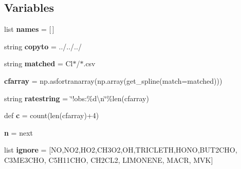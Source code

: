 \subsection*{Variables}
\begin{DoxyCompactItemize}
\item 
\mbox{\label{namespacefitobs_aabd7a9a2b56b48331a5d9031515b1592}} 
list {\bfseries names} = \mbox{[}$\,$\mbox{]}
\item 
\mbox{\label{namespacefitobs_afbd7256f05cd54c9c9db58e9d3765fab}} 
string {\bfseries copyto} = \textquotesingle{}../../../\textquotesingle{}
\item 
\mbox{\label{namespacefitobs_a758ea6e98824110c0ba642e2d769a5e9}} 
string {\bfseries matched} = \textquotesingle{}Cl$\ast$/$\ast$.csv\textquotesingle{}
\item 
\mbox{\label{namespacefitobs_a9be10627e3532d7207fafc7ac440bf77}} 
{\bfseries cfarray} = np.\+asfortranarray(np.\+array(get\+\_\+spline(match=matched)))
\item 
\mbox{\label{namespacefitobs_a54fc3cb1c10c750e595ba769b78f1227}} 
string {\bfseries ratestring} = \char`\"{}!obs\+:\%d\textbackslash{}n\char`\"{}\%len(cfarray)
\item 
\mbox{\label{namespacefitobs_a0e67329e8f106434fa57230f13817bc3}} 
def {\bfseries c} = count(len(cfarray)+4)
\item 
\mbox{\label{namespacefitobs_af113f905182192b4d1bc7992c04243a3}} 
{\bfseries n} = next
\item 
\mbox{\label{namespacefitobs_a7e96d20452734e6518b0c4afcf0edbcc}} 
list {\bfseries ignore} = \mbox{[}\textquotesingle{}NO\textquotesingle{},\textquotesingle{}N\+O2\textquotesingle{},\textquotesingle{}H\+O2\textquotesingle{},\textquotesingle{}C\+H3\+O2\textquotesingle{},\textquotesingle{}OH\textquotesingle{},\textquotesingle{}T\+R\+I\+C\+L\+E\+TH\textquotesingle{},\textquotesingle{}H\+O\+NO\textquotesingle{},\textquotesingle{}B\+U\+T2\+C\+HO\textquotesingle{}, \textquotesingle{}C3\+M\+E3\+C\+HO\textquotesingle{}, \textquotesingle{}C5\+H11\+C\+HO\textquotesingle{}, \textquotesingle{}C\+H2\+C\+L2\textquotesingle{}, \textquotesingle{}L\+I\+M\+O\+N\+E\+NE\textquotesingle{}, \textquotesingle{}M\+A\+CR\textquotesingle{}, \textquotesingle{}M\+VK\textquotesingle{}\mbox{]}

\end{DoxyCompactItemize}
